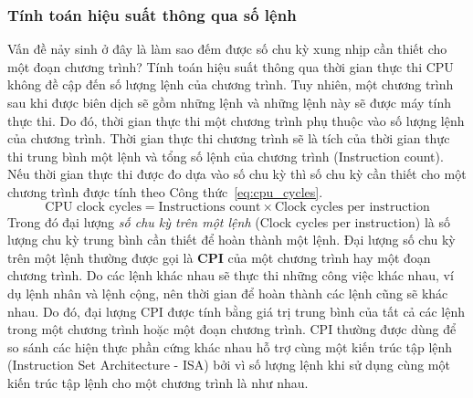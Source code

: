 \subsubsection{Tính toán hiệu suất thông qua số lệnh}
Vấn đề nảy sinh ở đây là làm sao đếm được số chu kỳ xung nhịp cần thiết cho một đoạn chương trình? Tính toán hiệu suất thông qua thời gian thực thi CPU không đề cập đến số lượng lệnh của chương trình. Tuy nhiên, một chương trình sau khi được biên dịch sẽ gồm những lệnh và những lệnh này sẽ được máy tính thực thi. Do đó, thời gian thực thi một chương trình phụ thuộc vào số lượng lệnh của chương trình. Thời gian thực thi chương trình sẽ là tích của thời gian thực thi trung bình một lệnh và tổng số lệnh của chương trình (Instruction count). Nếu thời gian thực thi được đo dựa vào số chu kỳ thì số chu kỳ cần thiết cho một chương trình được tính theo Công thức~\ref{eq:cpu_cycles}.
\begin{equation}
\label{eq:cpu_cycles}
\text{CPU clock cycles} = \text{Instructions count}\times\text{Clock cycles per instruction}
\end{equation}
Trong đó đại lượng \emph{số chu kỳ trên một lệnh} (Clock cycles per instruction) là số lượng chu kỳ trung bình cần thiết để hoàn thành một lệnh. Đại lượng số chu kỳ trên một lệnh thường được gọi là \textbf{CPI} của một chương trình hay một đoạn chương trình. Do các lệnh khác nhau sẽ thực thi những công việc khác nhau, ví dụ lệnh nhân và lệnh cộng, nên thời gian để hoàn thành các lệnh cũng sẽ khác nhau. Do đó, đại lượng CPI được tính bằng giá trị trung bình của tất cả các lệnh trong một chương trình hoặc một đoạn chương trình. CPI thường được dùng để so sánh các hiện thực phần cứng khác nhau hỗ trợ cùng một kiến trúc tập lệnh (Instruction Set Architecture - ISA) bởi vì số lượng lệnh khi sử dụng cùng một kiến trúc tập lệnh cho một chương trình là như nhau.

